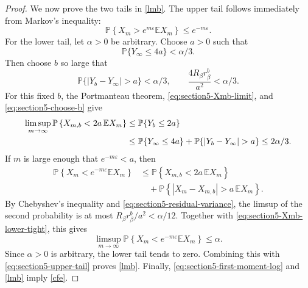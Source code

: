 \documentclass[10pt,a4paper]{amsart}
\begin{document}
\begin{proof}
We now prove the two tails in \eqref{lmb}.  The upper tail follows immediately
from Markov's inequality:
\begin{equation}\label{eq:section5-upper-tail}
  \mathbb P\left\{X_m>e^{m\varepsilon}\mathbb E X_m\right\}
  \le e^{-m\varepsilon}.
\end{equation}
For the lower tail, let $\alpha>0$ be arbitrary.  Choose $a>0$ such that
\[
  \mathbb P\{Y_\infty\le 4a\}<\alpha/3.
\]
Then choose $b$ so large that
\begin{equation}\label{eq:section5-choose-b}
  \mathbb P\{|Y_b-Y_\infty|>a\}<\alpha/3,
  \qquad
  \frac{4R_\beta r_\beta^b}{a^2}<\alpha/3.
\end{equation}
For this fixed $b$, the Portmanteau theorem, \eqref{eq:section5-Xmb-limit}, and \eqref{eq:section5-choose-b} give
\begin{align}\label{eq:section5-Xmb-lower-tight}
  \limsup_{m\to\infty}
  \mathbb P\left\{X_{m,b}<2a\,\mathbb E X_m\right\}
  &\le \mathbb P\{Y_b\le 2a\} \notag\\
  &\le \mathbb P\{Y_\infty\le 4a\}+\mathbb P\{|Y_b-Y_\infty|>a\}\le 2\alpha/3.
\end{align}
If $m$ is large enough that $e^{-m\varepsilon}<a$, then
\begin{align*}
\mathbb P\left\{X_m<e^{-m\varepsilon}\mathbb E X_m\right\}
&\le
\mathbb P\left\{X_{m,b}<2a\,\mathbb E X_m\right\} \\
&\quad+
\mathbb P\left\{|X_m-X_{m,b}|>a\,\mathbb E X_m\right\}.
\end{align*}
By Chebyshev's inequality and \eqref{eq:section5-residual-variance}, the limsup of
the second probability is at most $R_\beta r_\beta^b/a^2<\alpha/12$.  Together with
\eqref{eq:section5-Xmb-lower-tight}, this gives
\[
  \limsup_{m\to\infty}
  \mathbb P\left\{X_m<e^{-m\varepsilon}\mathbb E X_m\right\}
  \le \alpha .
\]
Since $\alpha>0$ is arbitrary, the lower tail tends to zero.  Combining this with
\eqref{eq:section5-upper-tail} proves \eqref{lmb}.  Finally,
\eqref{eq:section5-first-moment-log} and \eqref{lmb} imply \eqref{cfe}.
\end{proof}
\end{document}

